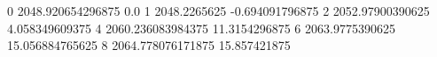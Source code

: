0 2048.920654296875 0.0
1 2048.2265625 -0.694091796875
2 2052.97900390625 4.058349609375
4 2060.236083984375 11.3154296875
6 2063.9775390625 15.056884765625
8 2064.778076171875 15.857421875
